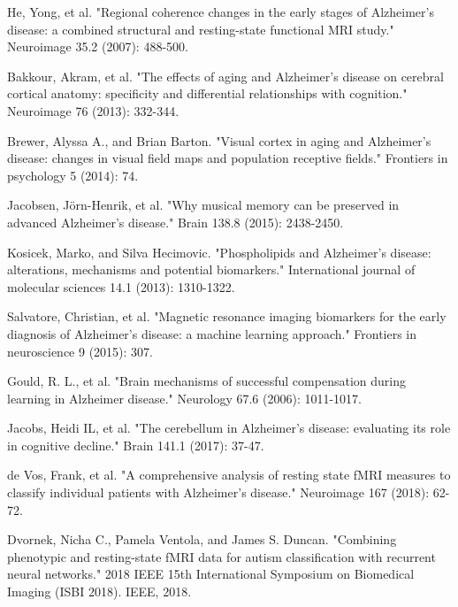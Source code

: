 \documentclass[journal]{IEEEtran}
\begin{document}
\begin{thebibliography}{1}
		He, Yong, et al. "Regional coherence changes in the early stages of Alzheimer’s disease: a combined structural and resting-state functional MRI study." Neuroimage 35.2 (2007): 488-500.
		
		
		
		Bakkour, Akram, et al. "The effects of aging and Alzheimer's disease on cerebral cortical anatomy: specificity and differential relationships with cognition." Neuroimage 76 (2013): 332-344.
		
		Brewer, Alyssa A., and Brian Barton. "Visual cortex in aging and Alzheimer's disease: changes in visual field maps and population receptive fields." Frontiers in psychology 5 (2014): 74.
		
		Jacobsen, Jörn-Henrik, et al. "Why musical memory can be preserved in advanced Alzheimer’s disease." Brain 138.8 (2015): 2438-2450.
		
		Kosicek, Marko, and Silva Hecimovic. "Phospholipids and Alzheimer’s disease: alterations, mechanisms and potential biomarkers." International journal of molecular sciences 14.1 (2013): 1310-1322.
		
		Salvatore, Christian, et al. "Magnetic resonance imaging biomarkers for the early diagnosis of Alzheimer's disease: a machine learning approach." Frontiers in neuroscience 9 (2015): 307.
		
		Gould, R. L., et al. "Brain mechanisms of successful compensation during learning in Alzheimer disease." Neurology 67.6 (2006): 1011-1017.
		
		Jacobs, Heidi IL, et al. "The cerebellum in Alzheimer’s disease: evaluating its role in cognitive decline." Brain 141.1 (2017): 37-47.
		
		de Vos, Frank, et al. "A comprehensive analysis of resting state fMRI measures to classify individual patients with Alzheimer's disease." Neuroimage 167 (2018): 62-72.
		
		Dvornek, Nicha C., Pamela Ventola, and James S. Duncan. "Combining phenotypic and resting-state fMRI data for autism classification with recurrent neural networks." 2018 IEEE 15th International Symposium on Biomedical Imaging (ISBI 2018). IEEE, 2018.
		
		
		
	\end{thebibliography}
	
	
\end{document}
